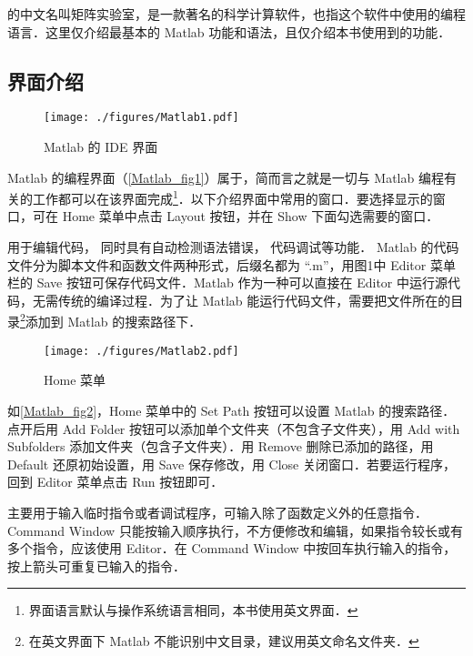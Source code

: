 
的中文名叫矩阵实验室，是一款著名的科学计算软件，也指这个软件中使用的编程语言．这里仅介绍最基本的 Matlab 功能和语法，且仅介绍本书使用到的功能．


\subsection{界面介绍}

\begin{figure}[ht]
\centering
\texttt{[image: ./figures/Matlab1.pdf]}
\caption{Matlab 的 IDE 界面}\label{Matlab_fig1}
\end{figure}

Matlab 的编程界面（\autoref{Matlab_fig1}）属于，简而言之就是一切与 Matlab 编程有关的工作都可以在该界面完成\footnote{界面语言默认与操作系统语言相同，本书使用英文界面．}．以下介绍界面中常用的窗口．要选择显示的窗口，可在 Home 菜单中点击 Layout 按钮，并在 Show 下面勾选需要的窗口．

 用于编辑代码， 同时具有自动检测语法错误， 代码调试等功能． Matlab 的代码文件分为脚本文件和函数文件两种形式，后缀名都为 “.m”，用图1中 Editor 菜单栏的 Save 按钮可保存代码文件．Matlab 作为一种可以直接在 Editor 中运行源代码，无需传统的编译过程．为了让 Matlab 能运行代码文件，需要把文件所在的目录\footnote{在英文界面下 Matlab 不能识别中文目录，建议用英文命名文件夹．}添加到 Matlab 的搜索路径下．

\begin{figure}[ht]
\centering
\texttt{[image: ./figures/Matlab2.pdf]}
\caption{Home 菜单}\label{Matlab_fig2}
\end{figure}

如\autoref{Matlab_fig2}，Home 菜单中的 Set Path 按钮可以设置 Matlab 的搜索路径．点开后用 Add Folder 按钮可以添加单个文件夹（不包含子文件夹），用 Add with Subfolders 添加文件夹（包含子文件夹）．用 Remove 删除已添加的路径，用 Default 还原初始设置，用 Save 保存修改，用 Close 关闭窗口．若要运行程序，回到 Editor 菜单点击 Run 按钮即可．

 主要用于输入临时指令或者调试程序，可输入除了函数定义外的任意指令．Command Window 只能按输入顺序执行，不方便修改和编辑，如果指令较长或有多个指令，应该使用 Editor．在 Command Window 中按回车执行输入的指令，按上箭头可重复已输入的指令．

